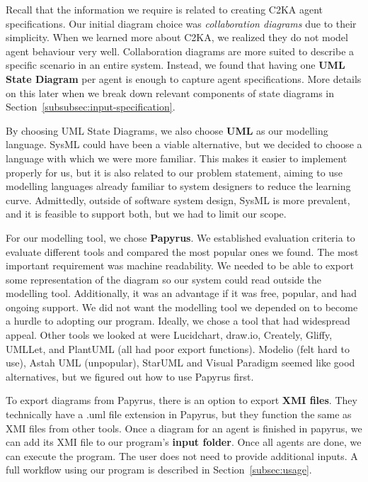 Recall that the information we require is related to creating C2KA agent specifications.
Our initial diagram choice was \textit{collaboration diagrams} due to their simplicity.
When we learned more about C2KA, we realized they do not model agent behaviour very well.
Collaboration diagrams are more suited to describe a specific scenario in an entire system.
Instead, we found that having one \textbf{UML State Diagram} per agent is enough to capture agent specifications.
More details on this later when we break down relevant components of state diagrams in Section~\ref{subsubsec:input-specification}.

By choosing UML State Diagrams, we also choose \textbf{UML} as our modelling language.
SysML could have been a viable alternative, but we decided to choose a language with which we were more familiar.
This makes it easier to implement properly for us,
but it is also related to our problem statement, aiming to use modelling languages already familiar to system designers to reduce the learning curve.
Admittedly, outside of software system design, SysML is more prevalent, and it is feasible to support both, but we had to limit our scope.

For our modelling tool, we chose \textbf{Papyrus}.
We established evaluation criteria to evaluate different tools and compared the most popular ones we found.
The most important requirement was machine readability.
We needed to be able to export some representation of the diagram so our system could read outside the modelling tool.
Additionally, it was an advantage if it was free, popular, and had ongoing support.
We did not want the modelling tool we depended on to become a hurdle to adopting our program.
Ideally, we chose a tool that had widespread appeal.
Other tools we looked at were Lucidchart, draw.io, Creately, Gliffy, UMLLet, and PlantUML (all had poor export functions).
Modelio (felt hard to use), Astah UML (unpopular),
StarUML and Visual Paradigm seemed like good alternatives, but we figured out how to use Papyrus first.

To export diagrams from Papyrus, there is an option to export \textbf{XMI files}.
They technically have a .uml file extension in Papyrus, but they function the same as XMI files from other tools.
Once a diagram for an agent is finished in papyrus, we can add its XMI file to our program's \textbf{input folder}.
Once all agents are done, we can execute the program.
The user does not need to provide additional inputs.
A full workflow using our program is described in Section~\ref{subsec:usage}.

